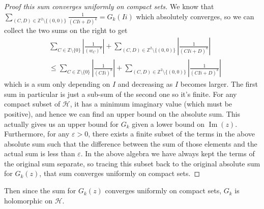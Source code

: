 \documentclass{article}
\theoremstyle{definition}
\theoremstyle{definition}
\theoremstyle{definition}
\newcommand{\Z}{\mathbb{Z}}
\begin{document}
\begin{proof}[Proof this sum converges uniformly on compact sets]
We know that $\sum_{(C,D)\in\Z^2\setminus\{(0,0)\}}\frac1{(CIi+D)^k}=G_k(Ii)$ which absolutely converges, so we can collect the two sums on the right to get
\begin{align*}
  &\sum_{C \in \mathbb{Z} \setminus \{0\}} \left| \frac{1}{(w_C)^k} \right| +\sum_{(C,D) \in \mathbb{Z}^2 \setminus \{(0,0)\}} \left| \frac{1}{(CIi + D)^k} \right|\\
  &\leq  \sum_{C \in \mathbb{Z} \setminus \{0\}} \left| \frac{1}{(CIi)^k} \right| +\sum_{(C,D) \in \mathbb{Z}^2 \setminus \{(0,0)\}} \left| \frac{1}{(CIi + D)^k} \right|
\end{align*}
which is a sum only depending on $I$ and decreasing as $I$ becomes larger. The first sum in particular is just a sub-sum of the second one so it's finite. For any compact subset of $\mathcal H$, it has a minimum imaginary value (which must be positive), and hence we can find an upper bound on the absolute sum. This actually gives us an upper bound for $G_k$ given a lower bound on $\operatorname{Im}(z)$. Furthermore, for any $\varepsilon>0$, there exists a finite subset of the terms in the above absolute sum such that the difference between the sum of those elements and the actual sum is less than $\varepsilon$. In the above algebra we have always kept the terms of the original sum separate, so tracing this subset back to the original absolute sum for $G_k(z)$, that sum converges uniformly on compact sets.
\end{proof}

Then since the sum for $G_k(z)$ converges uniformly on compact sets, $G_k$ is holomorphic on $\mathcal H$.
\end{document}
